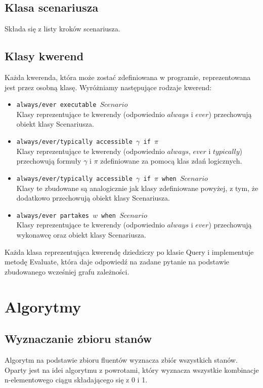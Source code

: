 \documentclass{article}
\begin{document}
\subsection{Klasa scenariusza}
Składa się z listy kroków scenariusza.

\subsection{Klasy kwerend}
Każda kwerenda, która może zostać zdefiniowana w programie, reprezentowana jest przez osobną klasę. Wyróżniamy następujące rodzaje kwerend:
\begin{itemize}
\item {\large\texttt{always/ever executable $Scenario$}} \\
Klasy reprezentujące te kwerendy (odpowiednio $always$ i $ever$) przechowują obiekt klasy Scenariusza.
\item {\large\texttt{always/ever/typically accessible $\gamma$ if $\pi$}}\\
Klasy reprezentujące te kwerendy (odpowiednio $always$, $ever$ i $typically$) przechowują formuły $\gamma$ i $\pi$ zdefiniowane za pomocą klas zdań logicznych.
\item {\large\texttt{always/ever/typically accessible $\gamma$ if $\pi$ when $Scenario$}}\\
Klasy te zbudowane są analogicznie jak klasy zdefiniowane powyżej, z tym, że dodatkowo przechowują obiekt klasy Scenariusza.
\item {\large\texttt{always/ever partakes $w$ when $Scenario$}}\\
Klasy reprezentujące te kwerendy (odpowiednio $always$ i $ever$) przechowują wykonawcę oraz obiekt klasy Scenariusza.
\end{itemize}
Każda klasa reprezentująca kwerendę dziedziczy po klasie Query i implementuje metodę Evaluate, która daje odpowiedź na zadane pytanie na podstawie zbudowanego wcześniej grafu zależności.
\newpage

\section{Algorytmy}

\subsection{Wyznaczanie zbioru stanów}
Algorytm na podstawie zbioru fluentów wyznacza zbiór wszystkich stanów. Oparty jest na idei algorytmu z powrotami, który wyznacza wszystkie kombinacje n-elementowego ciągu składającego się z 0 i 1.
\end{document}
